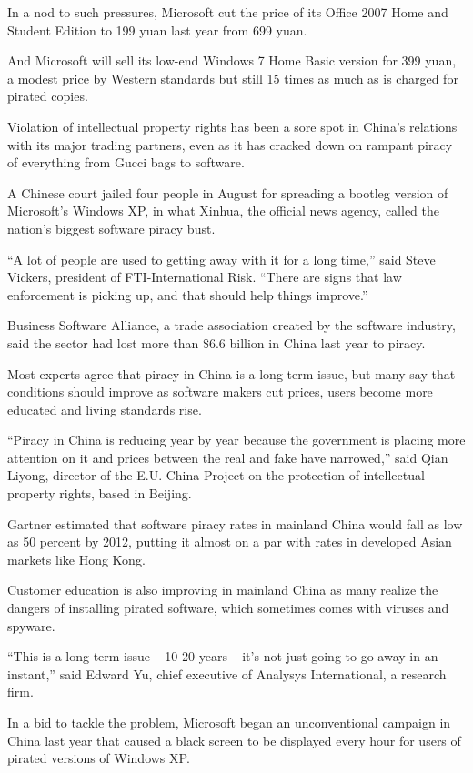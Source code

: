 ﻿\documentclass[12pt]{article}
\begin{document}
In a nod to such pressures, Microsoft cut the price of its Office 2007 Home and Student Edition to
199 yuan last year from 699 yuan.

And Microsoft will sell its low-end Windows 7 Home Basic version for 399 yuan, a modest price by
Western standards but still 15 times as much as is charged for pirated copies.

Violation of intellectual property rights has been a sore spot in China's relations with its major
trading partners, even as it has cracked down on rampant piracy of everything from Gucci bags to
software.

A Chinese court jailed four people in August for spreading a bootleg version of Microsoft's Windows
XP, in what Xinhua, the official news agency, called the nation's biggest software piracy bust.

``A lot of people are used to getting away with it for a long time,'' said Steve Vickers, president
of FTI-International Risk. ``There are signs that law enforcement is picking up, and that should
help things improve.''

Business Software Alliance, a trade association created by the software industry, said the sector
had lost more than \$6.6 billion in China last year to piracy.

Most experts agree that piracy in China is a long-term issue, but many say that conditions should
improve as software makers cut prices, users become more educated and living standards rise.

``Piracy in China is reducing year by year because the government is placing more attention on it
and prices between the real and fake have narrowed,'' said Qian Liyong, director of the E.U.-China
Project on the protection of intellectual property rights, based in Beijing.

Gartner estimated that software piracy rates in mainland China would fall as low as 50 percent by
2012, putting it almost on a par with rates in developed Asian markets like Hong Kong.

Customer education is also improving in mainland China as many realize the dangers of installing
pirated software, which sometimes comes with viruses and spyware.

``This is a long-term issue -- 10-20 years -- it's not just going to go away in an instant,'' said
Edward Yu, chief executive of Analysys International, a research firm.

In a bid to tackle the problem, Microsoft began an unconventional campaign in China last year that
caused a black screen to be displayed every hour for users of pirated versions of Windows XP.
\end{document}
